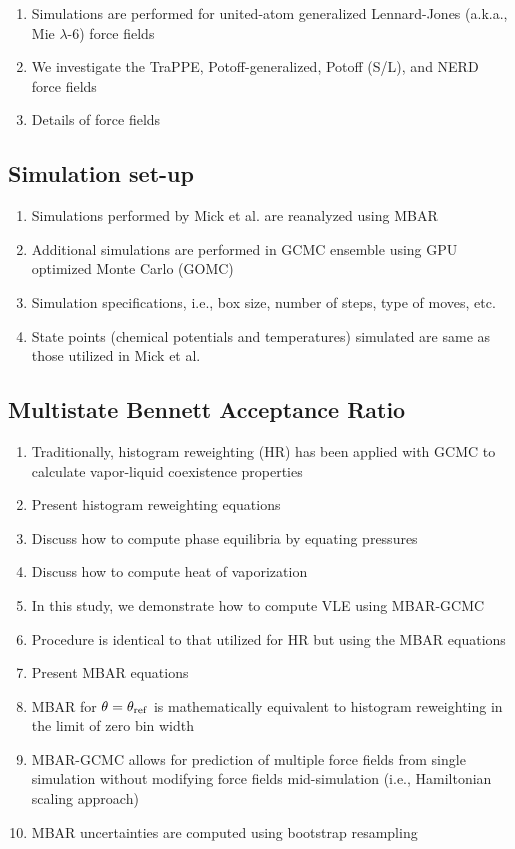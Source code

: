 \documentclass[11pt,a4paper]{article}
\begin{document}
\begin{enumerate}
	\item Simulations are performed for united-atom generalized Lennard-Jones (a.k.a., Mie $\lambda$-6) force fields
	\item We investigate the TraPPE, Potoff-generalized, Potoff (S/L), and NERD force fields 
	\item Details of force fields
\end{enumerate}

\subsection{Simulation set-up}

\begin{enumerate}
	\item Simulations performed by Mick et al. are reanalyzed using MBAR
	\item Additional simulations are performed in GCMC ensemble using GPU optimized Monte Carlo (GOMC)
	\item Simulation specifications, i.e., box size, number of steps, type of moves, etc.
	\item State points (chemical potentials and temperatures) simulated are same as those utilized in Mick et al.
\end{enumerate}

\subsection{Multistate Bennett Acceptance Ratio}

\begin{enumerate}
	\item Traditionally, histogram reweighting (HR) has been applied with GCMC to calculate vapor-liquid coexistence properties
	\item Present histogram reweighting equations
	\item Discuss how to compute phase equilibria by equating pressures
	\item Discuss how to compute heat of vaporization
	\item In this study, we demonstrate how to compute VLE using MBAR-GCMC
	\item Procedure is identical to that utilized for HR but using the MBAR equations
	\item Present MBAR equations
	\item MBAR for $\theta = \theta_{\rm ref}$ is mathematically equivalent to histogram reweighting in the limit of zero bin width
	\item MBAR-GCMC allows for prediction of multiple force fields from single simulation without modifying force fields mid-simulation (i.e., Hamiltonian scaling approach)
	\item MBAR uncertainties are computed using bootstrap resampling
\end{enumerate}
\end{document}
